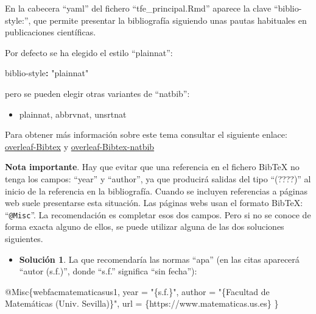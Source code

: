 \documentclass[12pt,a4paper,oneside,]{article}
\newenvironment{Shaded}{\begin{snugshade}}{\end{snugshade}}
\newcommand{\AttributeTok}[1]{\textcolor[rgb]{0.77,0.63,0.00}{#1}}
\newcommand{\CommentTok}[1]{\textcolor[rgb]{0.56,0.35,0.01}{\textit{#1}}}
\newcommand{\DataTypeTok}[1]{\textcolor[rgb]{0.13,0.29,0.53}{#1}}
\newcommand{\FunctionTok}[1]{\textcolor[rgb]{0.00,0.00,0.00}{#1}}
\newcommand{\KeywordTok}[1]{\textcolor[rgb]{0.13,0.29,0.53}{\textbf{#1}}}
\newcommand{\NormalTok}[1]{#1}
\newcommand{\OtherTok}[1]{\textcolor[rgb]{0.56,0.35,0.01}{#1}}
\newcommand{\StringTok}[1]{\textcolor[rgb]{0.31,0.60,0.02}{#1}}
\newcommand{\VariableTok}[1]{\textcolor[rgb]{0.00,0.00,0.00}{#1}}
\providecommand{\tightlist}{%
  \setlength{\itemsep}{0pt}\setlength{\parskip}{0pt}}
\numberwithin{dummy}{section}
\theoremstyle{ocrenumbox}
\theoremstyle{blacknumex}
\theoremstyle{blacknumbox}
\theoremstyle{ocrenum}
\theoremstyle{ocrenum}
\begin{document}
\normalsize

En la cabecera ``yaml'' del fichero ``tfe\_principal.Rmd'' aparece la
clave ``biblio-style:'', que permite presentar la bibliografía siguiendo
unas pautas habituales en publicaciones científicas.

Por defecto se ha elegido el estilo ``plainnat'':

\begin{Shaded}
\begin{Highlighting}[]
\FunctionTok{biblio{-}style}\KeywordTok{:}\AttributeTok{ }\StringTok{"plainnat"}\AttributeTok{ }
\end{Highlighting}
\end{Shaded}

pero se pueden elegir otras variantes de ``natbib'':

\begin{itemize}
\tightlist
\item
  plainnat, abbrvnat, unsrtnat
\end{itemize}

Para obtener más información sobre este tema consultar el siguiente
enlace:
\href{https://www.overleaf.com/learn/latex/Bibtex_bibliography_styles}{overleaf-Bibtex}
y
\href{https://www.overleaf.com/learn/latex/Bibliography_management_with_natbib}{overleaf-Bibtex-natbib}

\textbf{Nota importante}. Hay que evitar que una referencia en el
fichero BibTeX no tenga los campos: ``year'' y ``author'', ya que
producirá salidas del tipo ``(????)'' al inicio de la referencia en la
bibliografía. Cuando se incluyen referencias a páginas web suele
presentarse esta situación. Las páginas webs usan el formato BibTeX:
``\texttt{@Misc}''. La recomendación es completar esos dos campos. Pero
si no se conoce de forma exacta alguno de ellos, se puede utilizar
alguna de las dos soluciones siguientes.

\begin{itemize}
\tightlist
\item
  \textbf{Solución 1}. La que recomendaría las normas ``apa'' (en las
  citas aparecerá ``autor (s.f.)'', donde ``s.f.'' significa ``sin
  fecha''):
\end{itemize}

\begin{Shaded}
\begin{Highlighting}[]
\VariableTok{@Misc}\NormalTok{\{}\OtherTok{webfacmatematicasus1}\NormalTok{,}
  \DataTypeTok{year}\NormalTok{ = "}\StringTok{\{s.f.\}}\NormalTok{",}
  \DataTypeTok{author}\NormalTok{ = "}\StringTok{\{Facultad de Matemáticas (Univ. Sevilla)\}}\NormalTok{",}
  \DataTypeTok{url}\NormalTok{ = \{https://www.matematicas.us.es\}}
\NormalTok{\}}\CommentTok{ }
\end{Highlighting}
\end{Shaded}
\end{document}
